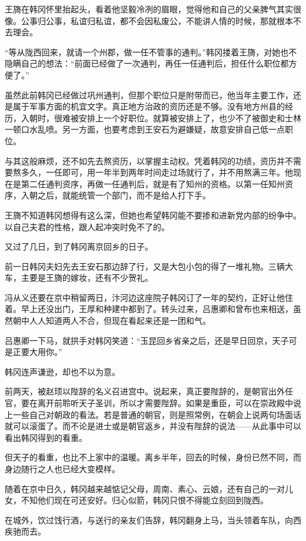 王旖在韩冈怀里抬起头，看着他坚毅冷冽的眉眼，觉得他和自己的父亲脾气其实很像。公事归公事，私谊归私谊，都不会因私废公，不能讲人情的时候，那就根本不去理会。

“等从陇西回来，就请一个州郡，做一任不管事的通判。”韩冈搂着王旖，对她也不隐瞒自己的想法：“前面已经做了一次通判，再任一任通判后，担任什么职位都方便了。”

虽然此前韩冈已经做过巩州通判，但那个职位只是附带而已，他当年主要工作，还是属于军事方面的机宜文字。真正地方治政的资历还是不够。没有地方州县的经历，入朝时，很难被安排上一个好职位。就算被安排上了，也少不了被御史和士林一顿口水乱喷。另一方面，也要考虑到王安石为避嫌疑，故意安排自己低一点职位。

与其这般麻烦，还不如先去熬资历，以掌握主动权。凭着韩冈的功绩，资历并不需要熬多久，一任即可，用一年半到两年时间走过场就行了，并不用熬满三年。他现在是第二任通判资序，再做一任通判后，就是有了知州的资格。以第一任知州资序，入朝之后，就能统管一个部门，而不是给人打下手。

王旖不知道韩冈想得有这么深，但她也希望韩冈能不要掺和进新党内部的纷争中。以自己夫君的性格，跟人起冲突时免不了的。

又过了几日，到了韩冈离京回乡的日子。

前一日韩冈夫妇先去王安石那边辞了行，又是大包小包的得了一堆礼物。三辆大车，主要是王旖的嫁妆，还有不少贺礼。

冯从义还要在京中稍留两日，汴河边这座院子韩冈订了一年的契约，正好让他住着。早上还没出门，王厚和种建中都到了。转头过来，吕惠卿和曾布也来相送，虽然朝中人人知道两人不合，但现在看起来还是一团和气。

吕惠卿一下马，就拱手对韩冈笑道：“玉昆回乡省亲之后，还是早日回京，天子可是正要大用你。”

韩冈连声谦逊，却也不以为意。

前两天，被赵顼以陛辞的名义召进宫中。说起来，真正要陛辞的，是朝官出外任官，要在离开前聆听天子圣训，所以才需要陛辞。如果是重臣，可以在崇政殿中说上一些自己对朝政的看法。若是普通的朝官，则是照常例，在朝会上说两句场面话就可以滚蛋了。而不论是进士或是朝官返乡，并没有陛辞的说法——从此事中可以看出韩冈得到的看重。

但天子的看重，也比不上家中的温暖。离乡半年，回去的时候，身份已然不同，而身边随行之人也已经大变模样。

随着在京中日久，韩冈越来越惦记父母，周南、素心、云娘，还有自己的一对儿女，不知他们现在可还安好。归心似箭，韩冈只恨不得能立刻回到陇西。

在城外，饮过饯行酒，与送行的亲友们告辞，韩冈翻身上马，当头领着车队，向西疾驰而去。

